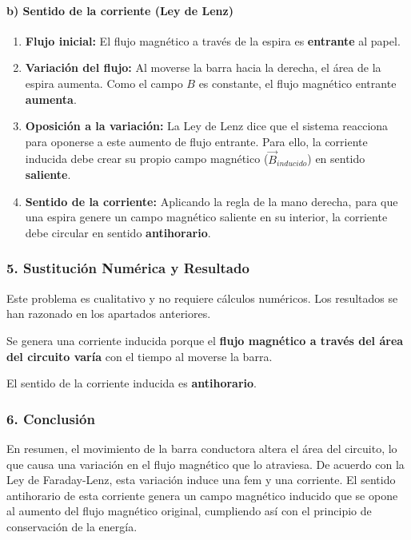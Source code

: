 \paragraph*{b) Sentido de la corriente (Ley de Lenz)}
\begin{enumerate}
    \item \textbf{Flujo inicial:} El flujo magnético a través de la espira es \textbf{entrante} al papel.
    \item \textbf{Variación del flujo:} Al moverse la barra hacia la derecha, el área de la espira aumenta. Como el campo $B$ es constante, el flujo magnético entrante \textbf{aumenta}.
    \item \textbf{Oposición a la variación:} La Ley de Lenz dice que el sistema reacciona para oponerse a este aumento de flujo entrante. Para ello, la corriente inducida debe crear su propio campo magnético ($\vec{B}_{inducido}$) en sentido \textbf{saliente}.
    \item \textbf{Sentido de la corriente:} Aplicando la regla de la mano derecha, para que una espira genere un campo magnético saliente en su interior, la corriente debe circular en sentido \textbf{antihorario}.
\end{enumerate}

\subsubsection*{5. Sustitución Numérica y Resultado}
Este problema es cualitativo y no requiere cálculos numéricos. Los resultados se han razonado en los apartados anteriores.
\begin{cajaresultado}
    Se genera una corriente inducida porque el \textbf{flujo magnético a través del área del circuito varía} con el tiempo al moverse la barra.
\end{cajaresultado}
\begin{cajaresultado}
    El sentido de la corriente inducida es \textbf{antihorario}.
\end{cajaresultado}

\subsubsection*{6. Conclusión}
\begin{cajaconclusion}
En resumen, el movimiento de la barra conductora altera el área del circuito, lo que causa una variación en el flujo magnético que lo atraviesa. De acuerdo con la Ley de Faraday-Lenz, esta variación induce una fem y una corriente. El sentido antihorario de esta corriente genera un campo magnético inducido que se opone al aumento del flujo magnético original, cumpliendo así con el principio de conservación de la energía.
\end{cajaconclusion}


